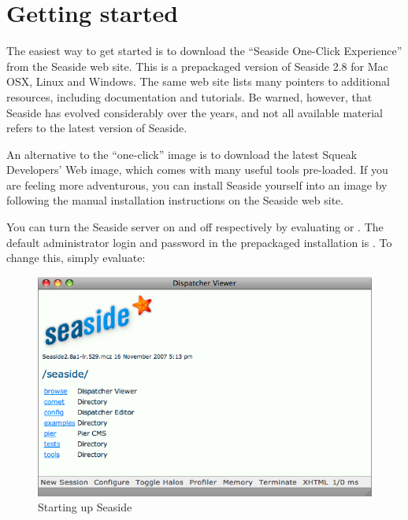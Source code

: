 \documentclass[a4paper,10pt,twoside]{book}
\begin{document}
\section{Getting started}

The easiest way to get started is to download the ``Seaside One-Click Experience'' from the Seaside web site\cite{Seaside}.
This is a prepackaged version of Seaside 2.8 for Mac OSX, Linux and Windows.
The same web site lists many pointers to additional resources, including documentation and tutorials.
Be warned, however, that Seaside has evolved considerably over the years, and not all available material refers to the latest version of Seaside.

An alternative to the ``one-click'' image is to download the latest Squeak Developers' Web image\cite{SqueakDevImage}, which comes with many useful tools pre-loaded.
If you are feeling more adventurous, you can install Seaside yourself into an image by following the manual installation instructions on the Seaside web site.

You can turn the Seaside server on and off respectively by evaluating
or
.
The default administrator login and password in the prepackaged installation is .
To change this, simply evaluate: 

\begin{figure}[ht]
\begin{center}
\includegraphics[width=\textwidth]{seasideStartup}
\caption{Starting up Seaside}
\label{fig:seasideStartup}
\end{center}
\end{figure}
\end{document}
